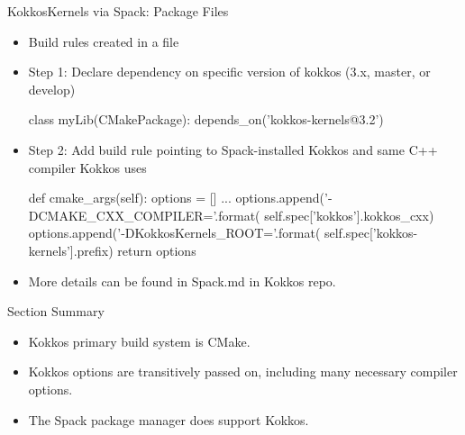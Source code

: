 \begin{frame}[fragile]{KokkosKernels via Spack: Package Files}
\begin{itemize}
\item Build rules created in a  file
\item Step 1: Declare dependency on specific version of kokkos (3.x, master, or develop)
\begin{shell}
class myLib(CMakePackage):
  depends_on('kokkos-kernels@3.2')
\end{shell}
\item Step 2: Add build rule pointing to Spack-installed Kokkos and same C++ compiler Kokkos uses
\begin{shell}
def cmake_args(self):
  options = []
  ...
  options.append('-DCMAKE_CXX_COMPILER={}'.format(
     self.spec['kokkos'].kokkos_cxx)
  options.append('-DKokkosKernels_ROOT={}'.format(
     self.spec['kokkos-kernels'].prefix)
  return options
\end{shell}
\item More details can be found in Spack.md in Kokkos repo.
\end{itemize}
\end{frame}

\begin{frame}{Section Summary}

  \begin{itemize}
    \item{Kokkos primary build system is CMake.}
    \item{Kokkos options are transitively passed on, including many necessary compiler options.}
    \item{The Spack package manager does support Kokkos.}
  \end{itemize}

\end{frame}

